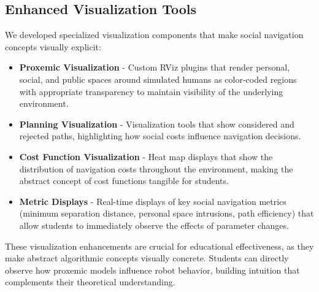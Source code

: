 \subsection{Enhanced Visualization Tools}
We developed specialized visualization components that make social navigation concepts 
visually explicit:
\begin{itemize}
    \item \textbf{Proxemic Visualization} - Custom RViz plugins that render personal, social, 
    and public spaces around simulated humans as color-coded regions with appropriate 
    transparency to maintain visibility of the underlying environment.
    \item \textbf{Planning Visualization} - Visualization tools that show considered and 
    rejected paths, highlighting how social costs influence navigation decisions.
    \item \textbf{Cost Function Visualization} - Heat map displays that show the distribution 
    of navigation costs throughout the environment, making the abstract concept of cost 
    functions tangible for students.
    \item \textbf{Metric Displays} - Real-time displays of key social navigation metrics 
    (minimum separation distance, personal space intrusions, path efficiency) that allow 
    students to immediately observe the effects of parameter changes.
\end{itemize}
These visualization enhancements are crucial for educational effectiveness, as they make abstract 
algorithmic concepts visually concrete. Students can directly observe how proxemic models 
influence robot behavior, building intuition that complements their theoretical understanding.

